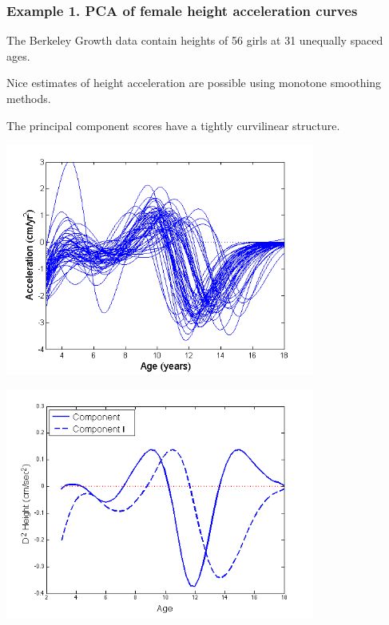 \documentclass[11pt]{beamer}
\begin{document}

\begin{frame}

\frametitle{Example 1.  PCA of female height acceleration curves}

\bi
  \item The Berkeley Growth data contain heights of 56 girls at 31 unequally spaced ages.
  \item Nice estimates of height acceleration are possible using monotone smoothing methods.
  \item The principal component scores have a tightly curvilinear structure.
\ei

\end{frame}


\begin{frame}

\begin{center}
\includegraphics[width=4in]{figs/FemaleAccel.png}
\end{center}

\end{frame}


\begin{frame}

\begin{center}
\includegraphics[width=4in]{figs/GrowthComponent_0.png}
\end{center}

\end{frame}
\end{document}
